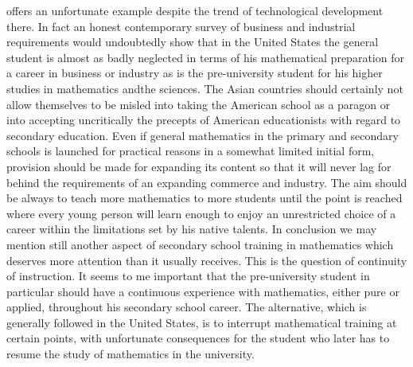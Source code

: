 offers an unfortunate example despite the trend of technological development there. In fact an honest contemporary survey of business and industrial requirements would undoubtedly show that in the United States the general student is almost as badly neglected in terms of his mathematical preparation for a career in business or industry as is the pre-university student for his higher studies in mathematics and\pageoriginale the sciences. The Asian countries should certainly not allow themselves to be misled into taking the American school as a paragon or into accepting uncritically the precepts of American educationists with regard to secondary education. Even if general mathematics in the primary and secondary schools is launched for practical reasons in a somewhat limited initial form, provision should be made for expanding its content so that it will never lag for behind the requirements of an expanding commerce and industry. The aim should be always to teach more mathematics to more students until the point is reached where every young person will learn enough to enjoy an unrestricted choice of a career within the limitations set by his native talents. In conclusion we may mention still another aspect of secondary school training in mathematics which deserves more attention than it usually receives. This is the question of continuity of instruction. It seems to me important that the pre-university student in particular should have a continuous experience with mathematics, either pure or applied, throughout his secondary school career. The alternative, which is generally followed in the United States, is to interrupt mathematical training at certain points, with unfortunate consequences for the student who later has to resume the study of mathematics in the university.

